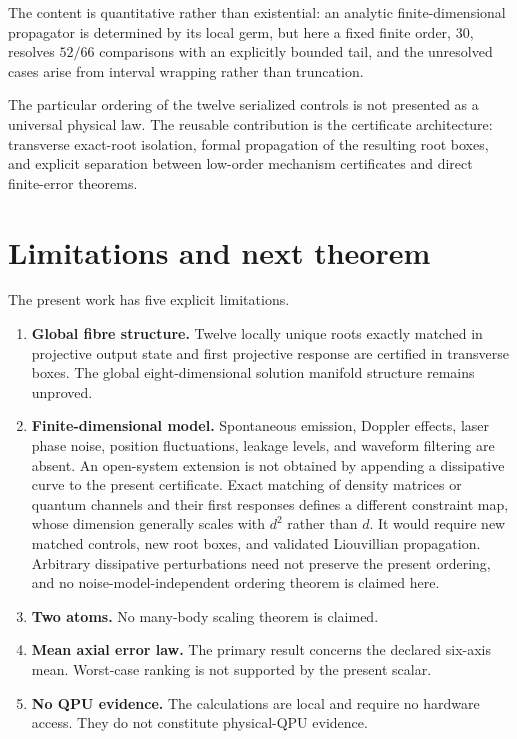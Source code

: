\documentclass[11pt]{article}
\begin{document}
The content is quantitative rather than existential: an analytic finite-dimensional propagator is determined by its local germ, but here a fixed finite order, 30, resolves $52/66$ comparisons with an explicitly bounded tail, and the unresolved cases arise from interval wrapping rather than truncation.

The particular ordering of the twelve serialized controls is not
presented as a universal physical law. The reusable contribution is the
certificate architecture: transverse exact-root isolation, formal
propagation of the resulting root boxes, and explicit separation between
low-order mechanism certificates and direct finite-error theorems.

\section{Limitations and next theorem}

The present work has five explicit limitations.
\begin{enumerate}[leftmargin=2.2em]
\item \textbf{Global fibre structure.}
Twelve locally unique roots exactly matched in projective output state and first projective response are certified in transverse boxes. The global eight-dimensional solution manifold structure remains unproved.
\item \textbf{Finite-dimensional model.}
Spontaneous emission, Doppler effects, laser phase noise, position fluctuations, leakage levels, and waveform filtering are absent.
An open-system extension is not obtained by appending a dissipative curve to
the present certificate. Exact matching of density matrices or quantum
channels and their first responses defines a different constraint map, whose
dimension generally scales with $d^2$ rather than $d$. It would require new
matched controls, new root boxes, and validated Liouvillian propagation.
Arbitrary dissipative perturbations need not preserve the present ordering,
and no noise-model-independent ordering theorem is claimed here.
\item \textbf{Two atoms.}
No many-body scaling theorem is claimed.
\item \textbf{Mean axial error law.}
The primary result concerns the declared six-axis mean. Worst-case ranking is not supported by the present scalar.
\item \textbf{No QPU evidence.}
The calculations are local and require no hardware access. They do not constitute physical-QPU evidence.
\end{enumerate}
\end{document}
